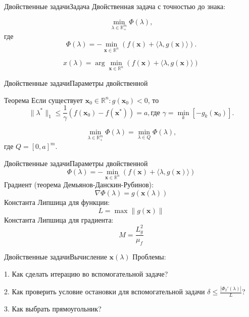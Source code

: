 \documentclass{beamer}
\begin{document}
\begin{frame}{Двойственные задачи}{Задача}
Двойственная задача с точностью до знака:

$$\min_{\lambda \in \mathbb{R}^m_+} \Phi(\lambda),$$
где $$\Phi(\lambda) = -\min\limits_{\textbf{x}\in \mathbb{R}^n}\left(f(\textbf{x}) + \langle\lambda, g(\textbf{x})\rangle\right).$$

$$x(\lambda) = \arg\min\limits_{\textbf{x}\in \mathbb{R}^n}\left(f(\textbf{x}) + \langle\lambda, g(\textbf{x})\rangle\right)$$
\end{frame}

\begin{frame}{Двойственные задачи}{Параметры двойственной}
\begin{block}{Теорема}
Если существует $\textbf{x}_0\in\mathbb{R}^n : g(\textbf{x}_0)<0$, то
$$\|\lambda^*\|_1 \leq \frac{1}{\gamma}\left(f(\textbf{x}_0)-f(\textbf{x}^*)\right)=a, \text{где } \gamma = \min_k \left[-g_k(\textbf{x}_0)\right].$$
\end{block}
\pause
$$\min_{\lambda\in\mathbb{R}^m_+}\Phi(\lambda) = \min_{\lambda\in Q}\Phi(\lambda),$$
где $Q = [0,a]^m$.
\end{frame}

\begin{frame}{Двойственные задачи}{Параметры двойственной}
$$\Phi(\lambda) = -\min\limits_{\textbf{x}\in \mathbb{R}^n}\left(f(\textbf{x}) + \langle\lambda, g(\textbf{x})\rangle\right)$$
Градиент (теорема Демьянов-Данскин-Рубинов):
$$\nabla \Phi(\lambda) = g(\textbf{x}(\lambda))$$
Константа Липшица для функции:
$$L = \max\|g(\textbf{x})\|$$
Константа Липшица для градиента:
$$M = \frac{L_g^2}{\mu_f}$$
\end{frame}

\begin{frame}{Двойственные задачи}{Вычисление $\textbf{x}(\lambda)$}
Проблемы:

1. Как сделать итерацию во вспомогательной задаче?

2. Как проверить условие остановки для вспомогательной задачи $\delta \leq \frac{|\Phi_2'(\lambda)|}{L}$?

3. Как выбрать прямоугольник?
\end{frame}
\end{document}
